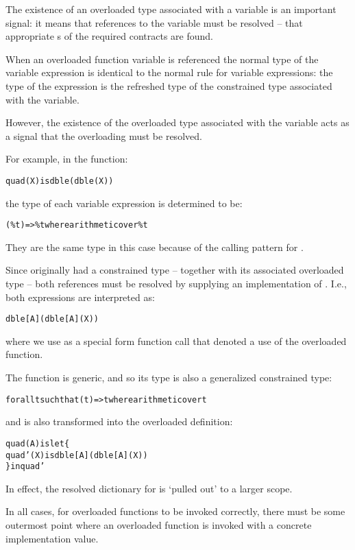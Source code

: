 \begin{aside}
The existence of an overloaded type associated with a variable is an important signal: it means that references to the variable must be resolved -- that appropriate s of the required contracts are found.
\end{aside}

When an overloaded function variable is referenced the normal type of the variable expression is identical to the normal rule for variable expressions: the type of the expression is the refreshed type of the constrained type associated with the variable.

However, the existence of the overloaded type associated with the variable acts as a signal that the overloading must be resolved.

For example, in the function:
\begin{alltt}
quad(X) is dble(dble(X))
\end{alltt}
the type of each  variable expression is determined to be:
\begin{alltt}
(\%t)=>\%t where arithmetic over \%t
\end{alltt}
\begin{aside}
They are the same type in this case because of the calling pattern for .
\end{aside}

Since  originally had a constrained type -- together with its associated overloaded type -- both references must be resolved by supplying an implementation of . I.e., both  expressions are interpreted as:
\begin{alltt}
dble[A](dble[A](X))
\end{alltt}
where we use  as a special form function call that denoted a use of the overloaded function.

The  function is generic, and so its type is also a generalized constrained type:
\begin{alltt}
for all t such that (t)=>t where arithmetic over t
\end{alltt}
and is also transformed into the overloaded definition:
\begin{alltt}
quad(A) is let\{
  quad'(X) is dble[A](dble[A](X))
\} in quad'
\end{alltt}
In effect, the resolved dictionary for  is `pulled out' to a larger scope. 

In all cases, for overloaded functions to be invoked correctly, there must be some outermost point where an overloaded function is invoked with a concrete implementation value. 

